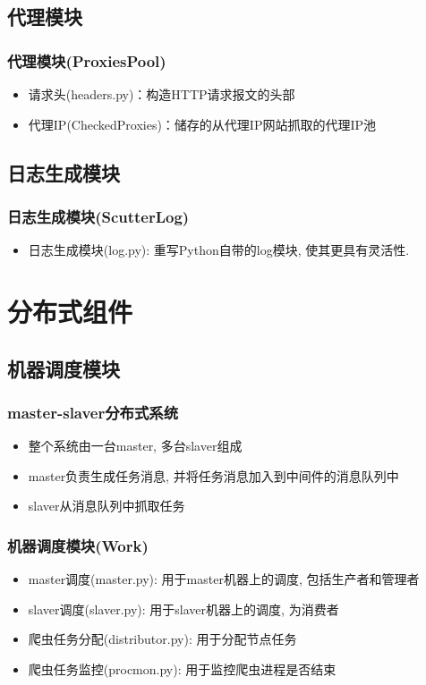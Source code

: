 \documentclass{beamer}
\begin{document}
\subsection{代理模块}
\begin{frame}
\frametitle{代理模块(ProxiesPool)}
\begin{itemize}
\item 请求头(headers.py)：构造HTTP请求报文的头部
\item 代理IP(CheckedProxies)：储存的从代理IP网站抓取的代理IP池
\end{itemize}
\end{frame}

\subsection{日志生成模块}
\begin{frame}
\frametitle{日志生成模块(ScutterLog)}
\begin{itemize}
\item 日志生成模块(log.py): 重写Python自带的log模块, 使其更具有灵活性.
\end{itemize}
\end{frame}

\section{分布式组件}

\subsection{机器调度模块}
\begin{frame}
\frametitle{master-slaver分布式系统}
\begin{itemize}
\item 整个系统由一台master, 多台slaver组成
\item master负责生成任务消息, 并将任务消息加入到中间件的消息队列中
\item slaver从消息队列中抓取任务
\end{itemize}
\end{frame}

\begin{frame}
\frametitle{机器调度模块(Work)}
\begin{itemize}
\item master调度(master.py): 用于master机器上的调度, 包括生产者和管理者
\item slaver调度(slaver.py): 用于slaver机器上的调度, 为消费者
\item 爬虫任务分配(distributor.py): 用于分配节点任务
\item 爬虫任务监控(procmon.py): 用于监控爬虫进程是否结束
\end{itemize}
\end{frame}
\end{document}
